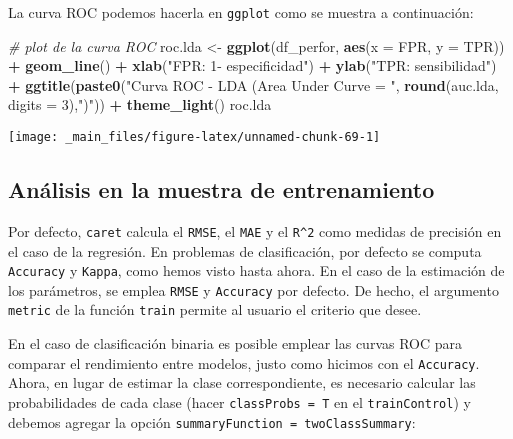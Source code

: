 \documentclass[]{book}
\newenvironment{Shaded}{\begin{snugshade}}{\end{snugshade}}
\newcommand{\CommentTok}[1]{\textcolor[rgb]{0.56,0.35,0.01}{\textit{#1}}}
\newcommand{\DataTypeTok}[1]{\textcolor[rgb]{0.13,0.29,0.53}{#1}}
\newcommand{\DecValTok}[1]{\textcolor[rgb]{0.00,0.00,0.81}{#1}}
\newcommand{\KeywordTok}[1]{\textcolor[rgb]{0.13,0.29,0.53}{\textbf{#1}}}
\newcommand{\NormalTok}[1]{#1}
\newcommand{\OperatorTok}[1]{\textcolor[rgb]{0.81,0.36,0.00}{\textbf{#1}}}
\newcommand{\StringTok}[1]{\textcolor[rgb]{0.31,0.60,0.02}{#1}}
\begin{document}
La curva ROC podemos hacerla en \texttt{ggplot} como se muestra a continuación:

\begin{Shaded}
\begin{Highlighting}[]
\CommentTok{# plot de la curva ROC}
\NormalTok{roc.lda <-}\StringTok{ }\KeywordTok{ggplot}\NormalTok{(df_perfor, }\KeywordTok{aes}\NormalTok{(}\DataTypeTok{x =}\NormalTok{ FPR, }\DataTypeTok{y =}\NormalTok{ TPR)) }\OperatorTok{+}
\StringTok{  }\KeywordTok{geom_line}\NormalTok{() }\OperatorTok{+}
\StringTok{  }\KeywordTok{xlab}\NormalTok{(}\StringTok{"FPR: 1- especificidad"}\NormalTok{) }\OperatorTok{+}\StringTok{ }\KeywordTok{ylab}\NormalTok{(}\StringTok{"TPR: sensibilidad"}\NormalTok{) }\OperatorTok{+}
\StringTok{  }\KeywordTok{ggtitle}\NormalTok{(}\KeywordTok{paste0}\NormalTok{(}\StringTok{"Curva ROC - LDA (Area Under Curve = "}\NormalTok{, }\KeywordTok{round}\NormalTok{(auc.lda, }\DataTypeTok{digits =} \DecValTok{3}\NormalTok{),}\StringTok{")"}\NormalTok{)) }\OperatorTok{+}
\StringTok{  }\KeywordTok{theme_light}\NormalTok{()}
\NormalTok{roc.lda}
\end{Highlighting}
\end{Shaded}

\begin{center}\texttt{[image: \_main\_files/figure-latex/unnamed-chunk-69-1]} \end{center}

\hypertarget{anuxe1lisis-en-la-muestra-de-entrenamiento}{%
\subsection{Análisis en la muestra de entrenamiento}\label{anuxe1lisis-en-la-muestra-de-entrenamiento}}

Por defecto, \texttt{caret} calcula el \texttt{RMSE}, el \texttt{MAE} y el \texttt{R\^{}2} como medidas de precisión en el caso de la regresión. En problemas de clasificación, por defecto se computa \texttt{Accuracy} y \texttt{Kappa}, como hemos visto hasta ahora. En el caso de la estimación de los parámetros, se emplea \texttt{RMSE} y \texttt{Accuracy} por defecto. De hecho, el argumento \texttt{metric} de la función \texttt{train} permite al usuario el criterio que desee.

En el caso de clasificación binaria es posible emplear las curvas ROC para comparar el rendimiento entre modelos, justo como hicimos con el \texttt{Accuracy}. Ahora, en lugar de estimar la clase correspondiente, es necesario calcular las probabilidades de cada clase (hacer \texttt{classProbs\ =\ T} en el \texttt{trainControl}) y debemos agregar la opción \texttt{summaryFunction\ =\ twoClassSummary}:
\end{document}
